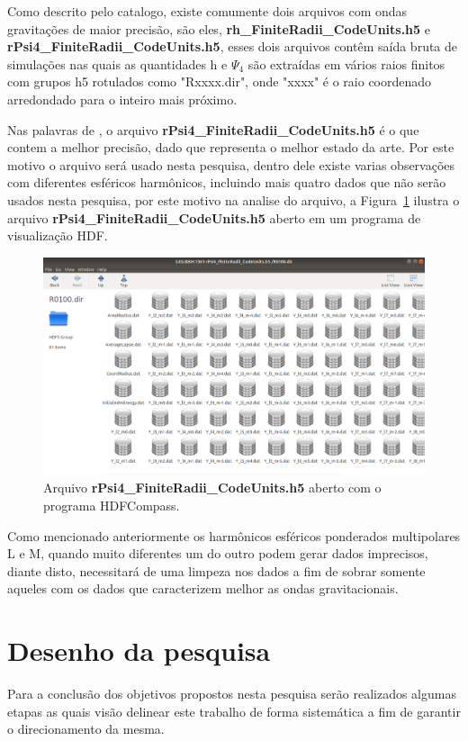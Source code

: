 Como descrito pelo catalogo, existe comumente dois arquivos com ondas gravitações de maior precisão, são eles,
\textbf{rh\_FiniteRadii\_CodeUnits.h5} e \\
\textbf{rPsi4\_FiniteRadii\_CodeUnits.h5}, esses dois arquivos contêm saída bruta de simulações nas quais as quantidades h e \(\Psi_{4}\) são extraídas em vários raios finitos com grupos h5 rotulados como "Rxxxx.dir", onde "xxxx" é o raio coordenado arredondado para o inteiro mais próximo.

Nas palavras de \cite{philipp}, o arquivo \textbf{rPsi4\_FiniteRadii\_CodeUnits.h5} é o que contem a melhor precisão, dado que representa o melhor estado da arte. Por este motivo o arquivo será usado nesta pesquisa, dentro dele existe varias observações com diferentes esféricos harmônicos, incluindo mais quatro dados que não serão usados nesta pesquisa, por este motivo na analise do arquivo, a Figura~\ref{figpsi4} ilustra o arquivo \textbf{rPsi4\_FiniteRadii\_CodeUnits.h5} aberto em um programa de visualização HDF.

\begin{figure}[ht]
\centering
\includegraphics[width=1\textwidth]{figuras/arquivorhpsi4.png}
\caption{Arquivo \textbf{rPsi4\_FiniteRadii\_CodeUnits.h5} aberto com o programa HDFCompass.}
\label{figpsi4}
\end{figure}

Como mencionado anteriormente os harmônicos esféricos ponderados multipolares L e M, quando muito diferentes um do outro podem gerar dados imprecisos, diante disto, necessitará de uma limpeza nos dados a fim de sobrar somente aqueles com os dados que caracterizem  melhor as ondas gravitacionais.

\section{Desenho da pesquisa}
Para a conclusão dos objetivos propostos nesta pesquisa serão realizados algumas etapas as quais visão delinear este trabalho de forma sistemática a fim de garantir o direcionamento da mesma. 

